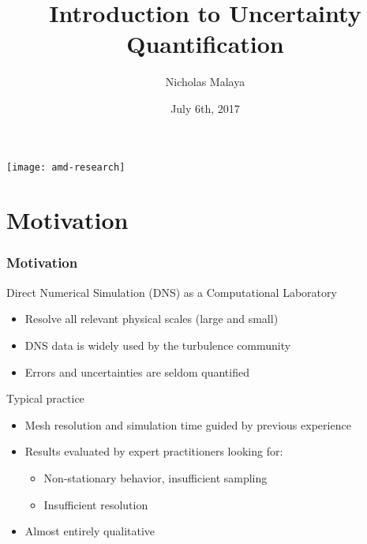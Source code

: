 \documentclass[mathserif]{beamer}
\date{July 6th, 2017}
\author[Malaya]{Nicholas Malaya}
\institute{
AMD Research \\
Advanced Micro Devices
}
\title[UQ]{Introduction to Uncertainty Quantification}
\begin{document}
\begin{frame}
%
 \titlepage
 \begin{flushright}
  \texttt{[image: amd-research]}\\
 \end{flushright}
%
\end{frame}



\section{Motivation}

\begin{frame}
\frametitle{Motivation}

 \begin{block}{Direct Numerical Simulation (DNS) as a Computational Laboratory}
  \begin{itemize}
   \item Resolve all relevant physical scales (large and small)
   \item DNS data is widely used by the turbulence community
   \item Errors and uncertainties are seldom quantified 
 \end{itemize}

 \end{block}

 \begin{block}{Typical practice}
  \begin{itemize}
  \item Mesh resolution and simulation time guided by previous experience
  \item Results evaluated by expert practitioners looking for:
    \begin{itemize}
    \item Non-stationary behavior, insufficient sampling
    \item Insufficient resolution
    \end{itemize}
  \item Almost entirely qualitative
  \end{itemize}
\end{block}

\end{frame}
\end{document}
